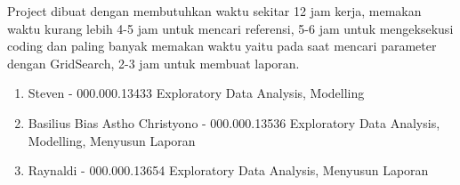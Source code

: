 \documentclass[12pt]{article}
\begin{document}
Project dibuat dengan membutuhkan waktu sekitar 12 jam kerja, memakan waktu kurang lebih 4-5 jam untuk mencari referensi, 5-6 jam untuk mengeksekusi coding dan paling banyak memakan waktu yaitu pada saat mencari parameter dengan GridSearch, 2-3 jam untuk membuat laporan.

\begin{enumerate}

    \item Steven - 000.000.13433
    \newline Exploratory Data Analysis, Modelling
    
    \item Basilius Bias Astho Christyono - 000.000.13536
    \newline Exploratory Data Analysis, Modelling, Menyusun Laporan
    
    \item Raynaldi - 000.000.13654
    \newline Exploratory Data Analysis, Menyusun Laporan
    
\end{enumerate}


\hspace{1 cm}
\newpage



\end{document}
